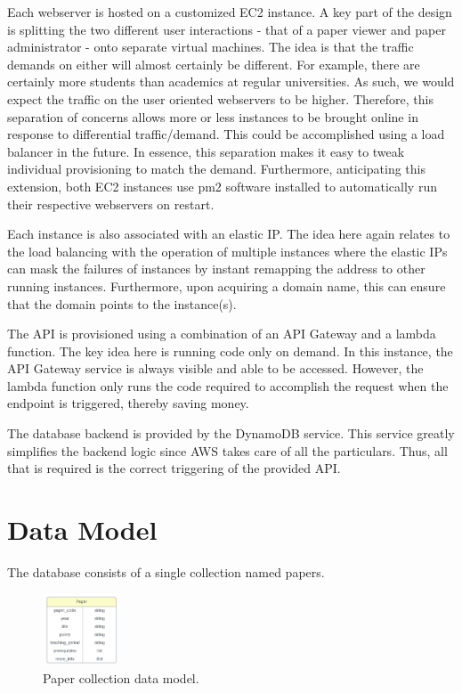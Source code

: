 \documentclass[12pt]{article}
\begin{document}
Each webserver is hosted on a customized EC2 instance. A key part of the design is splitting the two different user interactions - that of a paper viewer and paper administrator - onto separate virtual machines. The idea is that the traffic demands on either will almost certainly be different. For example, there are certainly more students than academics at regular universities. As such, we would expect the traffic on the user oriented webservers to be higher. Therefore, this separation of concerns allows more or less instances to be brought online in response to differential traffic/demand. This could be accomplished using a load balancer in the future. In essence, this separation makes it easy to tweak individual provisioning to match the demand. 
Furthermore, anticipating this extension, both EC2 instances use pm2 software installed to automatically run their respective webservers on restart. 

Each instance is also associated with an elastic IP. The idea here again relates to the load balancing with the operation of multiple instances where the elastic IPs can mask the failures of instances by instant remapping the address to other running instances. Furthermore, upon acquiring a domain name, this can ensure that the domain points to the instance(s).

The API is provisioned using a combination of an API Gateway and a lambda function. The key idea here is running code only on demand. In this instance, the API Gateway service is always visible and able to be accessed. However, the lambda function only runs the code required to accomplish the request when the endpoint is triggered, thereby saving money.   

The database backend is provided by the DynamoDB service. This service greatly simplifies the backend logic since AWS takes care of all the particulars. Thus, all that is required is the correct triggering of the provided API. 

\section{Data Model}
The database consists of a single collection named papers.

\begin{figure}
    \caption{Paper collection data model.}
    \label{fig: paper_data_model}
    \begin{center}
        \includegraphics[width=0.2\textwidth]{../docs-assets/paper_erd.PNG}
    \end{center}
\end{figure}
\end{document}
